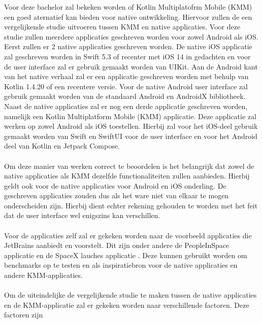 Voor deze bachelor zal bekeken worden of Kotlin Multiplatofrm Mobile (KMM) een goed aternatief kan bieden voor native ontwikkeling. Hiervoor zullen de een vergelijkende studie uitvoeren tussen KMM en native applicaties. Voor deze studie zullen meerdere applicaties geschreven worden voor zowel Android als iOS. Eerst zullen er 2 native applicaties geschreven worden. De native iOS applicatie zal geschreven worden in Swift 5.3 of recenter met iOS 14 in gedachten en voor de user interface zal er gebruik gemaakt worden van UIKit. Aan de Android kant van het native verhaal zal er een applicatie geschreven worden met behulp van Kotlin 1.4.20 of een recentere versie. Voor de native Android user interface zal gebruik gemaakt worden van de standaard Android en AndroidX bibliotheek. Naast de native applicaties zal er nog een derde applicatie geschreven worden, namelijk een Kotlin Multiplatform Mobile (KMM) applicatie. Deze applicatie zal werken op zowel Android als iOS toestellen. Hierbij zal voor het iOS-deel gebruik gemaakt worden van Swift en SwiftUI voor de user interface en voor het Android deel van Kotlin en Jetpack Compose.
\\ \\
Om deze manier van werken correct te beoordelen is het belangrijk dat zowel de native applicaties als KMM dezelfde functionaliteiten zullen aanbieden. Hierbij geldt ook voor de native applicaties voor Android en iOS onderling. De geschreven applicaties zouden dus als het ware niet van elkaar te mogen onderscheiden zijn. Hierbij dient echter rekening gehouden te worden met het feit dat de user interface wel enigszins kan verschillen.
\\ \\
Voor de applicaties zelf zal er gekeken worden naar de voorbeeld applicaties die JetBrains aanbiedt en voorstelt. Dit zijn onder andere de PeopleInSpace applicatie \autocite{OReilly2021} en de SpaceX lauches applicatie \autocite{Kotlin2020HandsOn}. Deze kunnen gebruikt worden om benchmarks op te testen en als inspiratiebron voor de native applicaties en andere KMM-applicaties.
\\ \\
Om de uiteindelijke de vergelijkende studie te maken tussen de native applicaties en de KMM-applicatie zal er gekeken worden naar verschillende factoren. Deze factoren zijn
